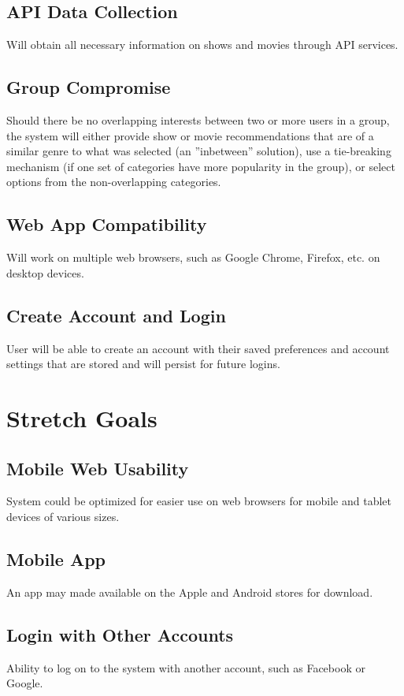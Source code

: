 \documentclass{article}
\begin{document}
\subsection{API Data Collection}
Will obtain all necessary information on shows and movies through API services.

\subsection{Group Compromise}
Should there be no overlapping interests between two or more users in a group, the system will either provide show or movie recommendations that are of a similar 
genre to what was selected (an ”inbetween” solution), use a tie-breaking mechanism (if one set of categories have more popularity in the group), or select options 
from the non-overlapping categories.

\subsection{Web App Compatibility}
Will work on multiple web browsers, such as Google Chrome, Firefox, etc. on desktop devices.

\subsection{Create Account and Login}
User will be able to create an account with their saved preferences and account settings that are stored and will persist for future logins.

\section{Stretch Goals}

\subsection{Mobile Web Usability}
System could be optimized for easier use on web browsers for mobile and tablet devices of various sizes.

\subsection{Mobile App}
An app may made available on the Apple and Android stores for download.

\subsection{Login with Other Accounts}
Ability to log on to the system with another account, such as Facebook or Google.
\end{document}
